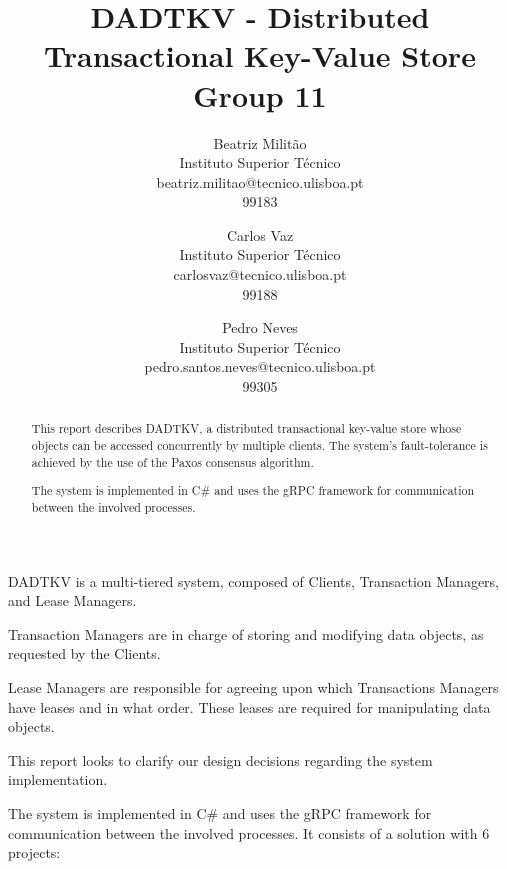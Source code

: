 \documentclass[times, 10pt,twocolumn]{article}
\begin{document}
\title{DADTKV - Distributed Transactional Key-Value Store \\ Group 11}

\author{Beatriz Militão\\
Instituto Superior Técnico\\
beatriz.militao@tecnico.ulisboa.pt\\
99183
\and
Carlos Vaz\\
Instituto Superior Técnico\\
carlosvaz@tecnico.ulisboa.pt\\
99188
\and
Pedro Neves\\
Instituto Superior Técnico\\
pedro.santos.neves@tecnico.ulisboa.pt\\
99305\\
}

\maketitle
\thispagestyle{empty}

\begin{abstract}
   This report describes DADTKV, a distributed transactional key-value store whose objects can be accessed concurrently by multiple clients. 
   The system's fault-tolerance is achieved by the use of the Paxos consensus algorithm.

   The system is implemented in C\# and uses the gRPC framework for communication between the involved processes.
\end{abstract}


DADTKV is a multi-tiered system, composed of Clients, Transaction Managers, and Lease Managers.

Transaction Managers are in charge of storing and modifying data objects, as requested by the Clients.

Lease Managers are responsible for agreeing upon which Transactions Managers have leases and in what order.
These leases are required for manipulating data objects.

This report looks to clarify our design decisions regarding the system implementation.


The system is implemented in C\# and uses the gRPC framework for communication between the involved processes.
It consists of a solution with 6 projects:
\end{document}
